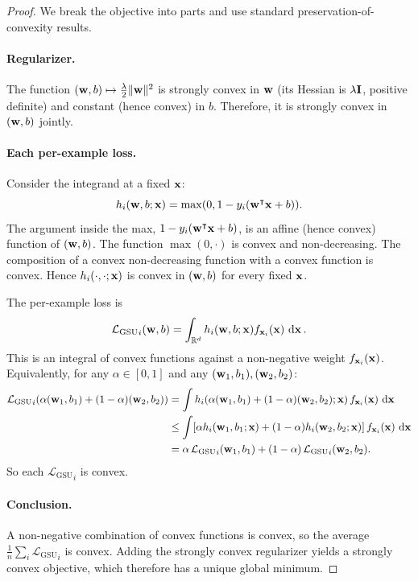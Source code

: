 \documentclass[11pt, letterpaper]{article}
\newcommand{\R}{\mathbb{R}}
\newcommand{\loss}{\mathcal{L}}
\begin{document}
\begin{proof}
We break the objective into parts and use standard preservation-of-convexity results.

\paragraph{Regularizer.} The function $(\vb{w}, b) \mapsto \frac{\lambda}{2}\|\vb{w}\|^2$ is strongly convex in $\vb{w}$ (its Hessian is $\lambda\vb{I}$, positive definite) and constant (hence convex) in $b$. Therefore, it is strongly convex in $(\vb{w}, b)$ jointly.

\paragraph{Each per-example loss.} Consider the integrand at a fixed $\vb{x}$:
\begin{equation}
    h_i(\vb{w}, b; \vb{x}) = \max(0, 1 - y_i(\vb{w}^{\intercal}\vb{x} + b)).
\end{equation}
The argument inside the max, $1 - y_i(\vb{w}^{\intercal}\vb{x} + b)$, is an affine (hence convex) function of $(\vb{w}, b)$. The function $\max(0, \cdot)$ is convex and non-decreasing. The composition of a convex non-decreasing function with a convex function is convex. Hence $h_i(\cdot, \cdot; \vb{x})$ is convex in $(\vb{w}, b)$ for every fixed $\vb{x}$.

The per-example loss is
\begin{equation}
    {\loss_{\text{GSU}}}_{i}(\vb{w}, b) = \int_{\R^d} h_i(\vb{w}, b; \vb{x}) f_{\vb{x}_i}(\vb{x})\,\dd{\vb{x}}.
\end{equation}
This is an integral of convex functions against a non-negative weight $f_{\vb{x}_i}(\vb{x})$. Equivalently, for any $\alpha \in [0, 1]$ and any $(\vb{w}_1, b_1), (\vb{w}_2, b_2)$:
\begin{align}
    {\loss_{\text{GSU}}}_{i}(\alpha(\vb{w}_1, b_1) + (1-\alpha)(\vb{w}_2, b_2)) &= \int h_i(\alpha(\vb{w}_1, b_1) + (1-\alpha)(\vb{w}_2, b_2); \vb{x})\, f_{\vb{x}_i}(\vb{x})\,\dd{\vb{x}} \notag \\
    &\leq \int [\alpha h_i(\vb{w}_1, b_1; \vb{x}) + (1-\alpha) h_i(\vb{w}_2, b_2; \vb{x})]\, f_{\vb{x}_i}(\vb{x})\,\dd{\vb{x}} \notag \\
    &= \alpha\,{\loss_{\text{GSU}}}_{i}(\vb{w}_1, b_1) + (1-\alpha)\,{\loss_{\text{GSU}}}_{i}(\vb{w}_2, b_2).
\end{align}
So each ${\loss_{\text{GSU}}}_{i}$ is convex.

\paragraph{Conclusion.} A non-negative combination of convex functions is convex, so the average $\frac{1}{n}\sum_i {\loss_{\text{GSU}}}_{i}$ is convex. Adding the strongly convex regularizer yields a strongly convex objective, which therefore has a unique global minimum.
\end{proof}
\end{document}
